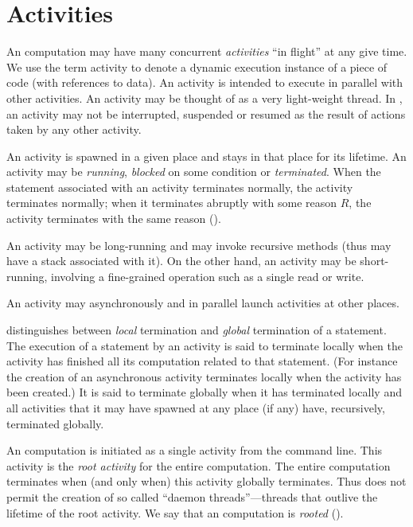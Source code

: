 \chapter{Activities}\label{XtenActivities}

An \Xten{} computation may have many concurrent {\em activities} ``in
flight'' at any give time. We use the term activity to denote a
dynamic execution instance of a piece of code (with references to
data). An activity is intended to execute in parallel with other
activities. An activity may be thought of as a very light-weight
thread.  In \XtenCurrVer{}, an activity may not be interrupted,
suspended or resumed as the result of actions taken by any other
activity.

An activity is spawned in a given place and stays in that place for
its lifetime.  An activity may be {\em running}, {\em blocked} on some
condition or {\em terminated}. When the statement associated with an
activity terminates normally, the activity terminates normally; when
it terminates abruptly with some reason $R$, the activity terminates
with the same reason ().

An activity may be long-running and may invoke recursive methods (thus
may have a stack associated with it). On the other hand, an activity
may be short-running, involving a fine-grained operation such as a
single read or write.


An activity may asynchronously and in parallel launch activities at
other places.

\Xten{} distinguishes between {\em local} termination and {\em global}
termination of a statement. The execution of a statement by an
activity is said to terminate locally when the activity has finished
all its computation related to that statement. (For instance the
creation of an asynchronous activity terminates locally when the
activity has been created.)  It is said to terminate globally when it
has terminated locally and all activities that it may have spawned at
any place (if any) have, recursively, terminated globally.

An \Xten{} computation is initiated as a single activity from the
command line. This activity is the {\em root activity} for the entire computation. The entire computation
terminates when (and only when) this activity globally
terminates. Thus \Xten{} does not permit the creation of so called
``daemon threads''---threads that outlive the lifetime of the root
activity. We say that an \Xten{} computation is {\em rooted}
().

